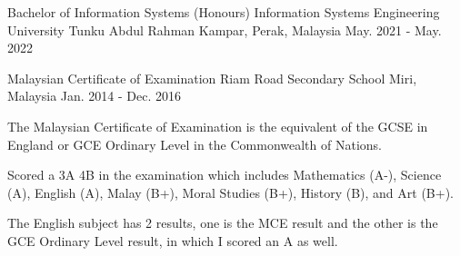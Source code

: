 

\begin{cventries}

  \cventry
    {Bachelor of Information Systems (Honours) Information Systems Engineering} %
    {University Tunku Abdul Rahman} %
    {Kampar, Perak, Malaysia} %
    {May. 2021 - May. 2022} %
    {
      \begin{cvitems} %
      \end{cvitems}
    }
  \cventry
    {Malaysian Certificate of Examination} %
    {Riam Road Secondary School} %
    {Miri, Malaysia} %
    {Jan. 2014 - Dec. 2016} %
    {
      \begin{cvitems} %
        \item {The Malaysian Certificate of Examination is the equivalent of the GCSE in England or GCE Ordinary Level in the Commonwealth of Nations.}
        \item {Scored a 3A 4B in the examination which includes Mathematics (A-), Science (A), English (A), Malay (B+), Moral Studies (B+), History (B), and Art (B+).}
        \item {The English subject has 2 results, one is the MCE result and the other is the GCE Ordinary Level result, in which I scored an A as well.}
      \end{cvitems}
    }
\end{cventries}
